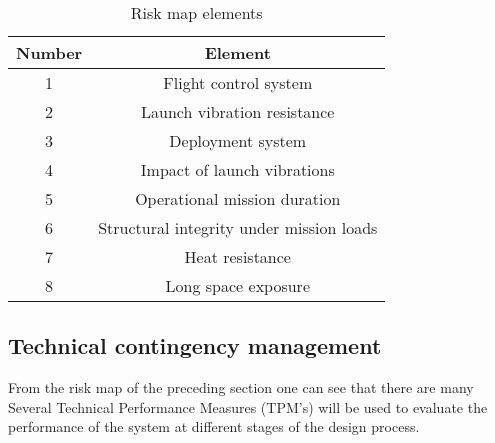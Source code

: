 \begin{table}[h]
\centering
\caption{Risk map elements}
\label{tab:riskelements}
\begin{tabular}{|c|c|}
\hline
\textbf{Number} & \textbf{Element} \\
\hline
1 & Flight control system\\
2 & Launch vibration resistance\\
3 & Deployment system\\
4 & Impact of launch vibrations\\
5 & Operational mission duration\\
6 & Structural integrity under mission loads\\
7 & Heat resistance\\
8 & Long space exposure\\

\hline
\end{tabular}
\end{table}

\subsection{Technical contingency management}
\label{sec:tca}
From the risk map of the preceding section one can see that there are many
Several Technical Performance Measures (TPM's) will be used to evaluate the performance of the system at different stages of the design process. 